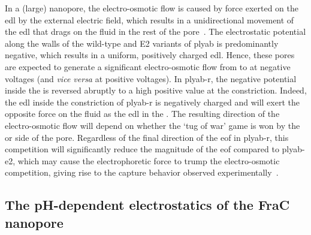 In a (large) nanopore, the electro-osmotic flow is caused by force exerted on the \gls{edl} by the external
electric field, which results in a unidirectional movement of the \gls{edl} that drags on the fluid in the
rest of the pore~\cite{Qiao-Aluru-2003,Mao-2014,Tagliazucchi-2015,Bonome-2017}. The electrostatic potential
along the walls of the wild-type and E2 variants of \gls{plyab} is predominantly negative, which results in a
uniform, positively charged \gls{edl}. Hence, these pores are expected to generate a significant
electro-osmotic flow from \cisi{} to \transi{} at negative voltages (and \textit{vice versa} at positive
voltages). In \gls{plyab-r}, the negative potential inside the \transi{} \lumen{} is reversed abruptly to a
high positive value at the \cisi{} constriction. Indeed, the \gls{edl} inside the constriction of
\gls{plyab-r} is negatively charged and will exert the opposite force on the fluid as the \gls{edl} in the
\transi{} \lumen{}. The resulting direction of the electro-osmotic flow will depend on whether the `tug of
war' game is won by the \cisi{} or \transi{} side of the pore. Regardless of the final direction of the
\gls{eof} in \gls{plyab-r}, this competition will significantly reduce the magnitude of the \gls{eof} compared
to \gls{plyab-e2}, which may cause the electrophoretic force to trump the electro-osmotic competition, giving
rise to the capture behavior observed experimentally~\cite{Huang-2020}.





\subsection{The {pH}-dependent electrostatics of the FraC nanopore}
%
\label{sec:elec:frac}
%

